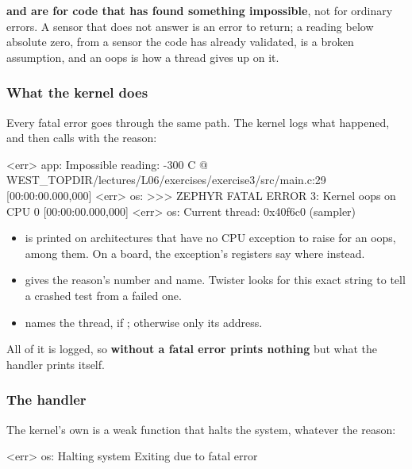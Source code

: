 \textbf{ and  are for code that has found something impossible}, not
for ordinary errors. A sensor that does not answer is an error to return; a reading below absolute
zero, from a sensor the code has already validated, is a broken assumption, and an oops is how a
thread gives up on it.

\subsubsection{What the kernel does}
Every fatal error goes through the same path. The kernel logs what happened, and then calls
\textbf{} with the reason:

\begin{console}
[00:00:00.000,000] <err> app: Impossible reading: -300 C
@ WEST_TOPDIR/lectures/L06/exercises/exercise3/src/main.c:29
[00:00:00.000,000] <err> os: >>> ZEPHYR FATAL ERROR 3: Kernel oops on CPU 0
[00:00:00.000,000] <err> os: Current thread: 0x40f6c0 (sampler)
\end{console}

\begin{itemize}
  \item \textbf{} is printed on architectures that have no CPU exception to raise for an
    oops,  among them. On a board, the exception’s registers say where instead.
  \item \textbf{} gives the reason’s number and name. Twister looks
    for this exact string to tell a crashed test from a failed one.
  \item \textbf{} names the thread, if ; otherwise only its
    address.
\end{itemize}

All of it is logged, so \textbf{without  a fatal error prints nothing} but what
the handler prints itself.

\subsubsection{The handler}
The kernel’s own  is a weak function that halts the system,
whatever the reason:

\begin{console}
[00:00:00.000,000] <err> os: Halting system
Exiting due to fatal error
\end{console}

